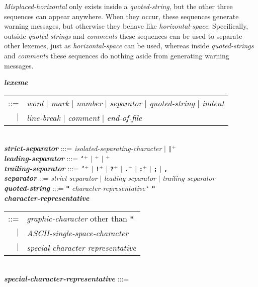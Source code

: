 \documentclass[12pt]{article}
\newcommand{\TT}[1]{{\tt \bfseries #1}}
\newcommand{\STAR}{{\Large $^\star$}}
\newcommand{\PLUS}[1][]{{$^{+#1}$}}
\newcommand{\emkey}[1]{{\em \bfseries #1}}
\newlength{\figurewidth}
\newenvironment{boxedfigure}[1][!btp]%
	{\begin{figure*}[#1]
	 \begin{lrbox}{\figurebox}
	 \begin{minipage}{\figurewidth}

	 \vspace*{1ex}}%
	{
	 \vspace*{1ex}

	 \end{minipage}
	 \end{lrbox}

	 \centering
	 \fbox{\hspace*{0.1in}\usebox{\figurebox}\hspace*{0.1in}}
	 \end{figure*}}
\newenvironment{indpar}[1][0.3in]%
	{\begin{list}{}%
		     {\setlength{\itemsep}{0in}%
		      \setlength{\topsep}{0in}%
		      \setlength{\parsep}{1ex}%
		      \setlength{\labelwidth}{#1}%
		      \setlength{\leftmargin}{#1}%
		      \addtolength{\leftmargin}{\labelsep}}%
	 \item}%
	{\end{list}}
\begin{document}
{\em Misplaced-horizontal} only exists inside a {\em quoted-string},
but the other three sequences can appear anywhere.  When they occur,
these sequences generate warning messages, but otherwise they behave
like {\em horizontal-space}.  Specifically, outside {\em quoted-strings}
and {\em comments} these sequences can be used to separate other lexemes,
just as {\em horizontal-space} can be used,
whereas inside {\em quoted-strings} and
{\em comments} these sequences do nothing aside from generating
warning messages.

\begin{boxedfigure}[!p]
\begin{indpar}

\emkey{lexeme}
        \begin{tabular}[t]{rl}
	::= & {\em word} $|$ {\em mark} $|$ {\em number} $|$
	      {\em separator} $|$ {\em quoted-string} $|$ {\em indent} \\
	$|$ & {\em line-break} $|$
	      {\em comment} $|$ {\em end-of-file}
	\end{tabular}
\label{LEXEME}
\\[1ex]
\emkey{strict-separator} :::= {\em isolated-separating-character} $|$
                              \TT{|}\PLUS{}
\\[0.5ex]
\emkey{leading-separator} :::=
	\TT{`}\PLUS{} $|$ 
	\TT{\textexclamdown}\PLUS{} $|$ \TT{\textquestiondown}\PLUS{}
\\[0.5ex]
\emkey{trailing-separator} :::= \TT{'}\PLUS{} $|$
				   \TT{!}\PLUS{} $|$
				   \TT{?}\PLUS{} $|$
				   \TT{.}\PLUS{} $|$
				   \TT{:}\PLUS{} $|$
				   \TT{;} $|$
				   \TT{,}
\\[0.5ex]
\emkey{separator}
    ::= {\em strict-separator} 
    $|$ {\em leading-separator}
    $|$ {\em trailing-separator}
\\[1ex]
\emkey{quoted-string}\label{QUOTED-STRING} :::=
    \TT{"} {\em character-representative}\,\STAR{} \TT{"}
\\[0.3ex]
\emkey{character-representative}\label{CHARACTER-REPRESENTATIVE}
	\begin{tabular}[t]{@{}rl@{}}
	::= & {\em graphic-character} other than \TT{"} \\
	$|$ & {\em ASCII-single-space-character} \\
	$|$ & {\em special-character-representative} \\
	\end{tabular}
\\[0.3ex]
\emkey{special-character-representative} :::= \\

\end{indpar}
\end{boxedfigure}
\end{document}
